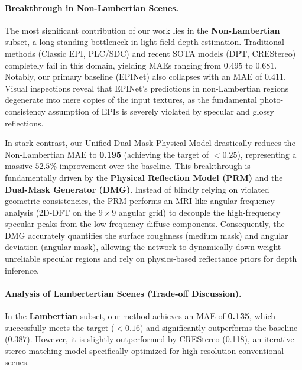 \paragraph{Breakthrough in Non-Lambertian Scenes.}

The most significant contribution of our work lies in the \textbf{Non-Lambertian} subset, a long-standing bottleneck in light field depth estimation. Traditional methods (Classic EPI, PLC/SDC) and recent SOTA models (DPT, CREStereo) completely fail in this domain, yielding MAEs ranging from $0.495$ to $0.681$. Notably, our primary baseline (EPINet) also collapses with an MAE of $0.411$. Visual inspections reveal that EPINet's predictions in non-Lambertian regions degenerate into mere copies of the input textures, as the fundamental photo-consistency assumption of EPIs is severely violated by specular and glossy reflections.

In stark contrast, our Unified Dual-Mask Physical Model drastically reduces the Non-Lambertian MAE to \textbf{0.195} (achieving the target of $< 0.25$), representing a massive $52.5\%$ improvement over the baseline. This breakthrough is fundamentally driven by the \textbf{Physical Reflection Model (PRM)} and the \textbf{Dual-Mask Generator (DMG)}. Instead of blindly relying on violated geometric consistencies, the PRM performs an MRI-like angular frequency analysis (2D-DFT on the $9 \times 9$ angular grid) to decouple the high-frequency specular peaks from the low-frequency diffuse components. Consequently, the DMG accurately quantifies the surface roughness (medium mask) and angular deviation (angular mask), allowing the network to dynamically down-weight unreliable specular regions and rely on physics-based reflectance priors for depth inference.

\paragraph{Analysis of Lambertertian Scenes (Trade-off Discussion).}

In the \textbf{Lambertian} subset, our method achieves an MAE of \textbf{0.135}, which successfully meets the target ($< 0.16$) and significantly outperforms the baseline ($0.387$). However, it is slightly outperformed by CREStereo (\underline{0.118}), an iterative stereo matching model specifically optimized for high-resolution conventional scenes.

